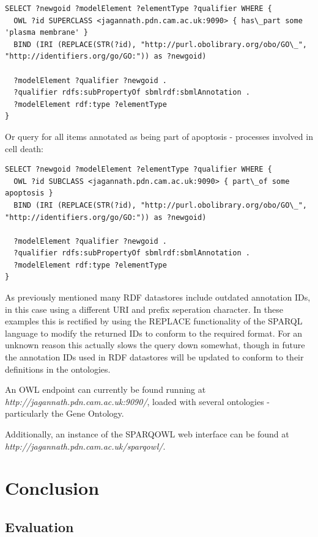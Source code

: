 \documentclass{article}
\begin{document}
\begin{lstlisting}
SELECT ?newgoid ?modelElement ?elementType ?qualifier WHERE {
  OWL ?id SUPERCLASS <jagannath.pdn.cam.ac.uk:9090> { has\_part some 'plasma membrane' }
  BIND (IRI (REPLACE(STR(?id), "http://purl.obolibrary.org/obo/GO\_", "http://identifiers.org/go/GO:")) as ?newgoid)

  ?modelElement ?qualifier ?newgoid .
  ?qualifier rdfs:subPropertyOf sbmlrdf:sbmlAnnotation .
  ?modelElement rdf:type ?elementType
}
\end{lstlisting}

Or query for all items annotated as being part of apoptosis - processes involved
in cell death:

\begin{lstlisting}
SELECT ?newgoid ?modelElement ?elementType ?qualifier WHERE {
  OWL ?id SUBCLASS <jagannath.pdn.cam.ac.uk:9090> { part\_of some apoptosis }
  BIND (IRI (REPLACE(STR(?id), "http://purl.obolibrary.org/obo/GO\_", "http://identifiers.org/go/GO:")) as ?newgoid)

  ?modelElement ?qualifier ?newgoid .
  ?qualifier rdfs:subPropertyOf sbmlrdf:sbmlAnnotation .
  ?modelElement rdf:type ?elementType
}
\end{lstlisting}

As previously mentioned many RDF datastores include outdated annotation IDs, in
this case using a different URI and prefix seperation character. In these
examples this is rectified by using the REPLACE functionality of the SPARQL
language to modify the returned IDs to conform to the required format. For an
unknown reason this actually slows the query down somewhat, though in future the
annotation IDs used in RDF datastores will be updated to conform to their
definitions in the ontologies.

An OWL endpoint can currently be found running at
\emph{http://jagannath.pdn.cam.ac.uk:9090/}, loaded with several ontologies -
particularly the Gene Ontology.

Additionally, an instance of the SPARQOWL web interface can be found at
\emph{http://jagannath.pdn.cam.ac.uk/sparqowl/}.

\section{Conclusion}

\subsection{Evaluation}
\end{document}
